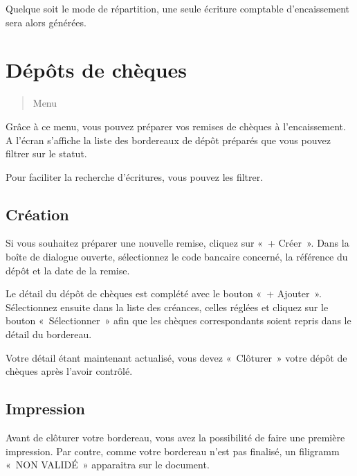 \documentclass[a4paper,10pt,oneside,french]{sphinxmanual}
\begin{document}
Quelque soit le mode de répartition, une seule écriture comptable d’encaissement sera alors générées.


\section{Dépôts de chèques}
\label{\detokenize{payoff/deposit:depots-de-cheques}}\label{\detokenize{payoff/deposit::doc}}\begin{quote}

Menu 
\end{quote}

Grâce à ce menu, vous pouvez préparer vos remises de chèques à l’encaissement.
A l’écran s’affiche la liste des bordereaux de dépôt préparés que vous pouvez filtrer sur le statut.
\begin{quote}

\noindent{}
\end{quote}

Pour faciliter la recherche d’écritures, vous pouvez les filtrer.


\subsection{Création}
\label{\detokenize{payoff/deposit:creation}}
Si vous souhaitez préparer une nouvelle remise, cliquez sur « + Créer ».
Dans la boîte de dialogue ouverte, sélectionnez le code bancaire concerné, la référence du dépôt et la date de la remise.

Le détail du dépôt de chèques est complété avec le bouton « + Ajouter ».
Sélectionnez ensuite dans la liste des créances, celles réglées et cliquez sur le bouton « Sélectionner » afin que les chèques correspondants soient repris dans le détail du bordereau.
\begin{quote}

\noindent{}
\end{quote}

Votre détail étant maintenant actualisé, vous devez « Clôturer » votre dépôt de chèques après l’avoir contrôlé.


\subsection{Impression}
\label{\detokenize{payoff/deposit:impression}}
Avant de clôturer votre bordereau, vous avez la possibilité de faire une première impression.
Par contre, comme votre bordereau n’est pas finalisé, un filigramm « NON VALIDÉ » apparaitra sur le document.
\end{document}
